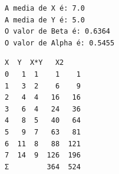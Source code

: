 \documentclass[11pt]{article}
\begin{document}
    \begin{Verbatim}[commandchars=\\\{\}]
A media de X é: 7.0
A media de Y é: 5.0
O valor de Beta é: 0.6364
O valor de Alpha é: 0.5455
    \end{Verbatim}

    
    \begin{Verbatim}[commandchars=\\\{\}]
    X  Y  X*Y   X2
0   1  1    1    1
1   3  2    6    9
2   4  4   16   16
3   6  4   24   36
4   8  5   40   64
5   9  7   63   81
6  11  8   88  121
7  14  9  126  196
Σ         364  524
    \end{Verbatim}

    
    \begin{center}
    \end{center}
    { \hspace*{\fill} \\}
    
\end{document}
